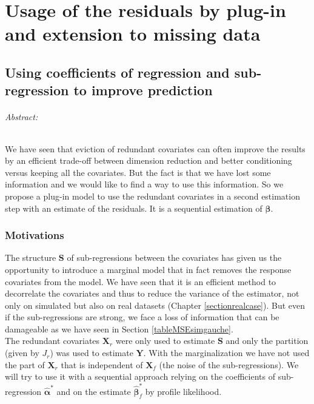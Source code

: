 \documentclass[12pt,a4paper]{report}
\begin{document}
\part{Usage of the residuals by plug-in \\ and extension to missing data}	
			
		
\chapter{Using coefficients of regression and sub-regression to improve prediction}\label{chapplugin}
	\paragraph{Abstract:} We have seen that eviction of redundant covariates can often improve the results by an efficient trade-off between dimension reduction and better conditioning versus keeping all the covariates. 
	But the fact is that we have lost some information and we would like to find a way to use this information. 
	So we propose a plug-in model to use the redundant covariates in a second estimation step with an estimate of the residuals. It is a sequential estimation of $\boldsymbol{\beta}$.
	\section{Motivations}
		The structure $\boldsymbol{S}$ of sub-regressions between the covariates has given us the opportunity to introduce a marginal model that in fact removes the response covariates from the model. We have seen that it is an efficient method to decorrelate the covariates and thus to reduce the variance of the estimator, not only on simulated but also on real datasets (Chapter \ref{sectionrealcase}). But even if the sub-regressions are strong, we face a loss of information that can be damageable as we have seen in Section \ref{tableMSEsimgauche}. \\
		
		The redundant covariates $\boldsymbol{X}_r$ were only used to estimate $\boldsymbol{S}$ and only the partition (given by $J_r$) was used to estimate $\boldsymbol{Y}$. With the marginalization we have not used the part of $\boldsymbol{X}_r$ that is independent of $\boldsymbol{X}_f$ (the noise of the sub-regressions). We will try to use it with a sequential approach relying on the coefficients of sub-regression $\hat{\boldsymbol{\alpha}}^*$ and on the estimate $\hat{\boldsymbol{\beta}}_f^*$ by profile likelihood.\\
		
\end{document}
